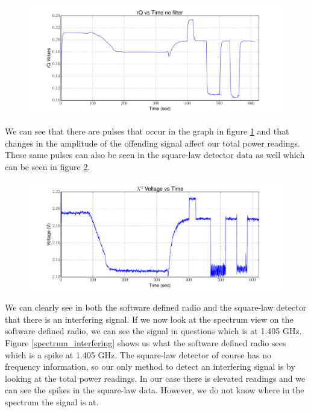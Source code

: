 {\begin{figure}[h!tb] \centering
\includegraphics[width=\textwidth]{Experiments/Exp4/sdr_raw_unfiltered.pdf}
\label{sdr_unfilt_raw}
\end{figure}

We can see that there are pulses that occur in the graph in figure \ref{sdr_unfilt_raw} and that changes in the amplitude of the offending signal affect our total power readings.  These same pulses can also be seen in the square-law detector data as well which can be seen in figure \ref{x2_unfilt}.

\begin{figure}[h!tb] \centering
\includegraphics[width=\textwidth]{Experiments/Exp4/x2_voltage.pdf}
\label{x2_unfilt}
\end{figure}

We can clearly see in both the software defined radio and the square-law detector that there is an interfering signal.  If we now look at the spectrum view on the software defined radio, we can see the signal in questions which is at 1.405 GHz.  Figure \ref{spectrum_interfering} shows us what the software defined radio sees which is a spike at 1.405 GHz.  The square-law detector of course has no frequency information, so our only method to detect an interfering signal is by looking at the total power readings.  In our case there is elevated readings and we can see the spikes in the square-law data.  However, we do not know where in the spectrum the signal is at.

}
